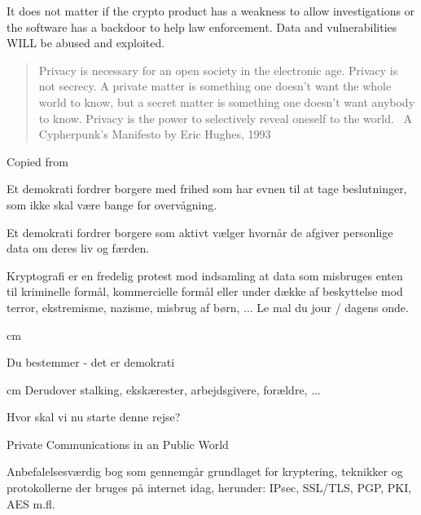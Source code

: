 \documentclass[20pt,landscape,a4paper,footrule]{foils}
\begin{document}
It does not matter if the crypto product has a weakness to allow investigations or the software has a backdoor to help law enforcement. Data and vulnerabilities WILL be abused and exploited.




\begin{quote}
	Privacy is necessary for an open society in the electronic age. Privacy is not secrecy. A private matter is something one doesn't want the whole world to know, but a secret matter is something one doesn't want anybody to know. Privacy is the power to selectively reveal oneself to the world. ~A Cypherpunk's Manifesto by Eric Hughes, 1993
\end{quote}

Copied from 




Et demokrati fordrer borgere med frihed som har evnen til at tage beslutninger, som ikke skal være bange for overvågning.

Et demokrati fordrer borgere som aktivt vælger hvornår de afgiver personlige data om deres liv og færden.


Kryptografi er en fredelig protest mod indsamling at data som misbruges enten til kriminelle formål, kommercielle formål eller under dække af beskyttelse mod terror, ekstremisme, nazisme, misbrug af børn, ... Le mal du jour / dagens onde.

 cm
\centerline{\Large Du bestemmer - det er demokrati}

 cm
Derudover stalking, ekskærester, arbejdsgivere, forældre, ...




Hvor skal vi nu starte denne rejse?

\centerline{Private Communications in an Public World}

Anbefalelsesværdig bog som gennemgår grundlaget for kryptering, teknikker og protokollerne der bruges på internet idag, herunder: IPsec, SSL/TLS, PGP, PKI, AES m.fl.


\end{document}

